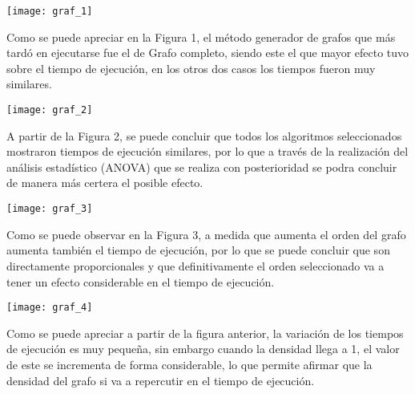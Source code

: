 \documentclass[10pt,a4paper]{article}
\begin{document}
\begin{center}

\texttt{[image: graf\_1]}

\end{center}

Como se puede apreciar en la Figura 1, el método generador de grafos que más tardó en ejecutarse fue el de Grafo completo, siendo este el que mayor efecto tuvo sobre el tiempo de ejecución, en los otros dos casos los tiempos fueron muy similares.  

\begin{center}

\texttt{[image: graf\_2]}

\end{center}

A partir de la Figura 2, se puede concluir que todos los algoritmos seleccionados mostraron tiempos de ejecución similares, por lo que a través de la realización del análisis estadístico (ANOVA) que se realiza con posterioridad se podra concluir de manera más certera el posible efecto. 

\begin{center}

\texttt{[image: graf\_3]}

\end{center}

Como se puede observar en la Figura 3, a medida que aumenta el orden del grafo aumenta también el tiempo de ejecución, por lo que se puede concluir que son directamente proporcionales y que definitivamente el orden seleccionado va a tener un efecto considerable en el tiempo de ejecución.

\begin{center}

\texttt{[image: graf\_4]}

\end{center}

Como se puede apreciar a partir de la figura anterior, la variación de los tiempos de ejecución es muy pequeña, sin embargo cuando la densidad llega a 1, el valor de este se incrementa de forma considerable, lo que permite afirmar que la densidad del grafo si va a repercutir en el tiempo de ejecución.\vspace{.4cm}\newpage
\end{document}
